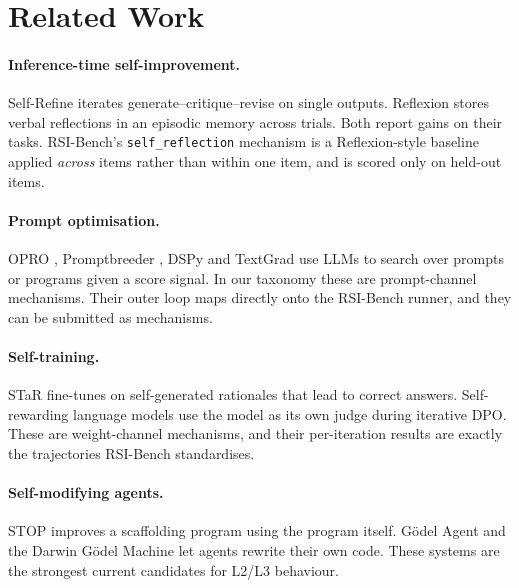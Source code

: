 \documentclass[11pt]{article}
\begin{document}
\section{Related Work}

\paragraph{Inference-time self-improvement.} Self-Refine \citep{madaan2023selfrefine} iterates generate--critique--revise on single outputs. Reflexion \citep{shinn2023reflexion} stores verbal reflections in an episodic memory across trials. Both report gains on their tasks. RSI-Bench's \texttt{self\_reflection} mechanism is a Reflexion-style baseline applied \emph{across} items rather than within one item, and is scored only on held-out items.

\paragraph{Prompt optimisation.} OPRO \citep{yang2023opro}, Promptbreeder \citep{fernando2023promptbreeder}, DSPy \citep{khattab2023dspy} and TextGrad \citep{yuksekgonul2024textgrad} use LLMs to search over prompts or programs given a score signal. In our taxonomy these are prompt-channel mechanisms. Their outer loop maps directly onto the RSI-Bench runner, and they can be submitted as mechanisms.

\paragraph{Self-training.} STaR \citep{zelikman2022star} fine-tunes on self-generated rationales that lead to correct answers. Self-rewarding language models \citep{yuan2024selfrewarding} use the model as its own judge during iterative DPO. These are weight-channel mechanisms, and their per-iteration results are exactly the trajectories RSI-Bench standardises.

\paragraph{Self-modifying agents.} STOP \citep{zelikman2023stop} improves a scaffolding program using the program itself. G\"odel Agent \citep{yin2024godelagent} and the Darwin G\"odel Machine \citep{zhang2025dgm} let agents rewrite their own code. These systems are the strongest current candidates for L2/L3 behaviour.
\end{document}
